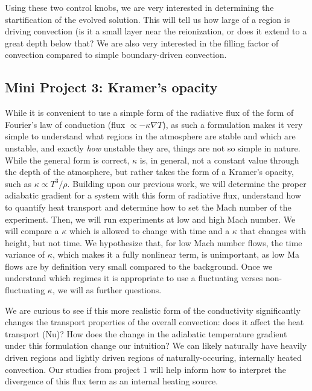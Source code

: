 \documentclass[aasms,12pt]{article}
\newcommand{\grad}{\ensuremath{\nabla}}
\begin{document}
Using these two control knobs, we are very interested in determining the startification of the evolved
solution.  This will tell us how large of a region is driving convection (is it a small layer 
near the reionization, or does it extend to a great depth below that?  We are also very interested
in the filling factor of convection compared to simple boundary-driven convection.



\subsection{Mini Project 3: Kramer's opacity}
While it is convenient to use a simple form of the radiative flux of the form of
Fourier's law of conduction \cite{lecoanet&all2014} (flux $\propto -\kappa \grad T$), as such a formulation
makes it very simple to understand what regions in the atmosphere are stable and which
are unstable, and exactly \emph{how} unstable they are, things are not so simple in nature.
While the general form is correct, $\kappa$ is, in general, not a constant value through the
depth of the atmosphere, but rather takes the form of a Kramer's opacity, such as 
$\kappa \propto T^3 / \rho$. Building upon our previous work, we will determine the proper
adiabatic gradient for a system with this form of radiative flux, understand how to quantify
heat transport and determine how to set the Mach number of the experiment.  Then, we will run experiments 
at low and high Mach number.  We will compare a $\kappa$ which is allowed to change with time
and a $\kappa$ that changes with height, but not time.  We hypothesize that, for low Mach number
flows, the time variance of $\kappa$, which makes it a fully nonlinear term, is unimportant, as
low Ma flows are by definition very small compared to the background.  Once we understand which
regimes it is appropriate to use a fluctuating verses non-fluctuating $\kappa$, we will
as further questions.

We are curious to see if this more realistic form of the conductivity significantly changes
the transport properties of the overall convection: does it affect the heat transport
(Nu)?  How does the change in the adiabatic temperature gradient under this formulation
change our intuition?  We can likely naturally have heavily driven regions and lightly
driven regions of naturally-occuring, internally heated convection.  Our studies from project
1 will help inform how to interpret the divergence of this flux term as an internal heating
source.
\end{document}
